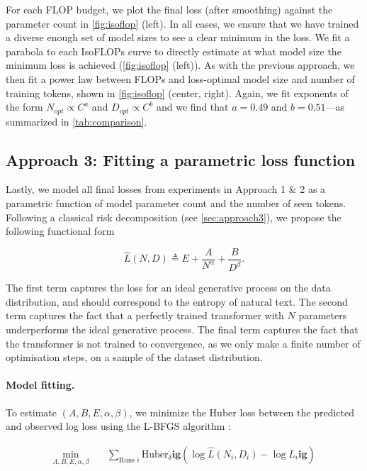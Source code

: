 For each FLOP budget, we plot the final loss (after smoothing) against the parameter count in \autoref{fig:isoflop} (left). In all cases, we ensure that we have trained a diverse enough set of model sizes to see a clear minimum in the loss. We fit a parabola to each IsoFLOPs curve to directly estimate at what model size the minimum loss is achieved (\autoref{fig:isoflop} (left)). As with the previous approach, we then fit a power law between FLOPs and loss-optimal model size and number of training tokens, shown in \autoref{fig:isoflop} (center, right). Again, we fit exponents of the form $N_{opt} \propto C^a$ and $D_{opt} \propto C^b$ and we find that $a=0.49$ and $b=0.51$---as summarized in \autoref{tab:comparison}.

\subsection{Approach 3: Fitting a parametric loss function} Lastly, we model all final losses from experiments in Approach 1 \& 2 as a parametric function of model parameter count and the number of seen tokens. Following a classical risk decomposition (see \autoref{sec:approach3}), we propose the following functional form

\begin{equation}
    \hat L(N,D) \triangleq E + \frac{A}{N^\alpha} + \frac{B}{D^\beta}.\label{eq:decompose}
\end{equation}

The first term captures the loss for an ideal generative process on the data distribution, and should correspond to the entropy of natural text. The second term captures the fact that a perfectly trained transformer with $N$ parameters underperforms the ideal generative process. The final term captures the fact that the transformer is not trained to convergence, as we only make a finite number of optimisation steps, on a sample of the dataset distribution.

\paragraph{Model fitting.} To estimate $(A, B, E, \alpha, \beta)$, we minimize the Huber loss \citep{huber_robust_1964} between the predicted and observed log loss using the L-BFGS algorithm \citep{nocedal_updating_1980}:

\begin{align}
    \min_{A, B, E, \alpha, \beta}\quad &\sum_{\text{Runs }i} \text{Huber}_\delta \mathbf{ig}(\log \hat L(N_i, D_i) - \log L_i\mathbf{ig}) \label{eq:huber}
\end{align}

